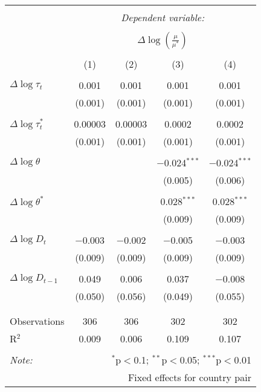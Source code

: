 
\begin{tabular}{@{\extracolsep{5pt}}lcccc} 
\\[-1.8ex]\hline 
\hline \\[-1.8ex] 
 & \multicolumn{4}{c}{\textit{Dependent variable:}} \\ 
\cline{2-5} 
\\[-1.8ex] & \multicolumn{4}{c}{$\Delta \log \left(\frac{\mu}{\mu^*} \right)$} \\ 
\\[-1.8ex] & (1) & (2) & (3) & (4)\\ 
\hline \\[-1.8ex] 
 $\Delta \log \tau_t$ & 0.001 & 0.001 & 0.001 & 0.001 \\ 
  & (0.001) & (0.001) & (0.001) & (0.001) \\ 
  & & & & \\ 
 $\Delta \log \tau_t^*$ & 0.00003 & 0.00003 & 0.0002 & 0.0002 \\ 
  & (0.001) & (0.001) & (0.001) & (0.001) \\ 
  & & & & \\ 
 $\Delta \log \theta$ &  &  & $-$0.024$^{***}$ & $-$0.024$^{***}$ \\ 
  &  &  & (0.005) & (0.006) \\ 
  & & & & \\ 
 $\Delta \log \theta^*$ &  &  & 0.028$^{***}$ & 0.028$^{***}$ \\ 
  &  &  & (0.009) & (0.009) \\ 
  & & & & \\ 
 $\Delta \log D_{t}$ & $-$0.003 & $-$0.002 & $-$0.005 & $-$0.003 \\ 
  & (0.009) & (0.009) & (0.009) & (0.009) \\ 
  & & & & \\ 
 $\Delta \log D_{t-1}$ & 0.049 & 0.006 & 0.037 & $-$0.008 \\ 
  & (0.050) & (0.056) & (0.049) & (0.055) \\ 
  & & & & \\ 
\hline \\[-1.8ex] 
Observations & 306 & 306 & 302 & 302 \\ 
R$^{2}$ & 0.009 & 0.006 & 0.109 & 0.107 \\ 
\hline 
\hline \\[-1.8ex] 
\textit{Note:}  & \multicolumn{4}{r}{$^{*}$p$<$0.1; $^{**}$p$<$0.05; $^{***}$p$<$0.01} \\ 
 & \multicolumn{4}{r}{Fixed effects for country pair} \\ 
\end{tabular} 
